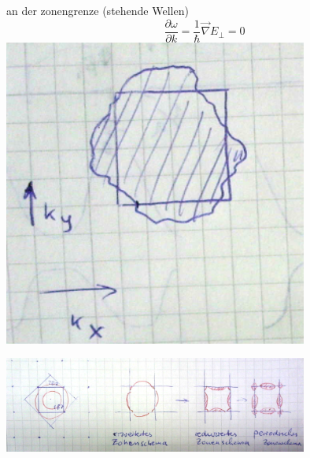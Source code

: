 an der zonengrenze (stehende Wellen)
\[\frac{\partial\omega}{\partial k}=\frac{1}{\hbar}\vec \nabla E_\bot =0\]
\includegraphics[width=0.75\textwidth]{kap06_48.png}






\includegraphics[width=0.75\textwidth]{kap06_49.png}





